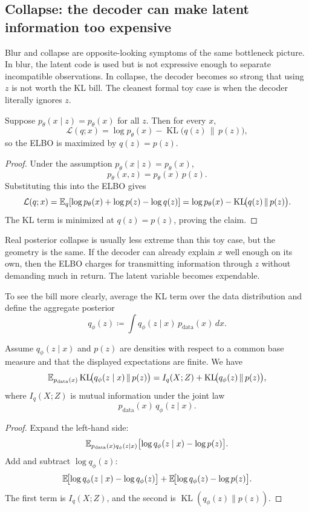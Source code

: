 \documentclass[11pt]{article}
\begin{document}
\subsection{Collapse: the decoder can make latent information too expensive}
\label{subsec:collapse}

Blur and collapse are opposite-looking symptoms of the same bottleneck picture.
In blur, the latent code is used but is not expressive enough to separate incompatible observations.
In collapse, the decoder becomes so strong that using \(z\) is not worth the KL bill.
The cleanest formal toy case is when the decoder literally ignores \(z\).

\begin{proposition}
\label{prop:collapse-if-decoder-ignores-z}
Suppose \(p_\theta(x\mid z)=p_\theta(x)\) for all \(z\).
Then for every \(x\),
\[
  \mathcal{L}(q;x)=\log p_\theta(x)-\operatorname{KL}\!\bigl(q(z)\,\|\,p(z)\bigr),
\]
so the ELBO is maximized by \(q(z)=p(z)\).
\end{proposition}
\begin{proof}
Under the assumption \(p_\theta(x\mid z)=p_\theta(x)\),
\[
  p_\theta(x,z)=p_\theta(x)\,p(z).
\]
Substituting this into the ELBO gives
\[
  \mathcal{L}(q;x)
  =
  \mathbb{E}_q[\log p_\theta(x)+\log p(z)-\log q(z)]
  =
  \log p_\theta(x)-\operatorname{KL}\!\bigl(q(z)\,\|\,p(z)\bigr).
\]
The KL term is minimized at \(q(z)=p(z)\), proving the claim.%
\end{proof}

Real posterior collapse is usually less extreme than this toy case, but the geometry is the same.
If the decoder can already explain \(x\) well enough on its own, then the ELBO charges for transmitting information through \(z\) without demanding much in return.
The latent variable becomes expendable.

To see the bill more clearly, average the KL term over the data distribution and define the aggregate posterior
\[
  q_\phi(z)
  \coloneqq
  \int q_\phi(z\mid x)\,p_{\mathrm{data}}(x)\,dx.
\]

\begin{proposition}
\label{prop:mi-decomposition}
Assume \(q_\phi(z\mid x)\) and \(p(z)\) are densities with respect to a common base measure and that the displayed expectations are finite.
We have
\[
  \mathbb{E}_{p_{\mathrm{data}}(x)}
  \operatorname{KL}\!\bigl(q_\phi(z\mid x)\,\|\,p(z)\bigr)
  =
  I_q(X;Z)
  +
  \operatorname{KL}\!\bigl(q_\phi(z)\,\|\,p(z)\bigr),
\]
where \(I_q(X;Z)\) is mutual information under the joint law
\[
  p_{\mathrm{data}}(x)\,q_\phi(z\mid x).
\]
\end{proposition}
\begin{proof}
Expand the left-hand side:
\[
  \mathbb{E}_{p_{\mathrm{data}}(x)q_\phi(z\mid x)}
  \bigl[\log q_\phi(z\mid x)-\log p(z)\bigr].
\]
Add and subtract \(\log q_\phi(z)\):
\[
  \mathbb{E}\!\bigl[\log q_\phi(z\mid x)-\log q_\phi(z)\bigr]
  +
  \mathbb{E}\!\bigl[\log q_\phi(z)-\log p(z)\bigr].
\]
The first term is \(I_q(X;Z)\), and the second is
\(\operatorname{KL}(q_\phi(z)\|p(z))\).%
\end{proof}
\end{document}
